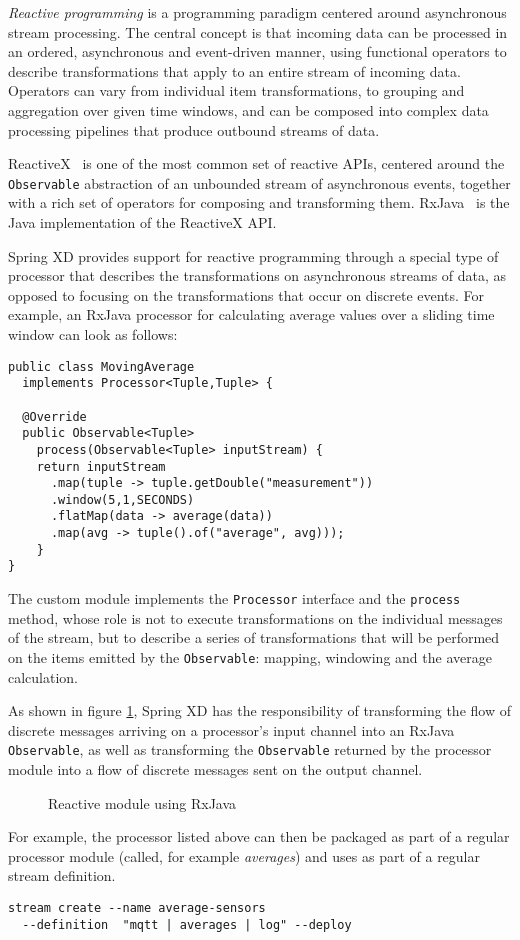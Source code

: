 \emph{Reactive programming} is a programming paradigm centered around asynchronous
stream processing. The central concept is that incoming data can be processed in an
ordered, asynchronous and event-driven manner, using functional operators to describe
transformations that apply to an entire stream of incoming data. Operators can
vary from individual item transformations, to grouping and aggregation over given
time windows, and can be composed into complex data processing pipelines that produce
outbound streams of data.

ReactiveX~\cite{reactivex} is one of the most common set of reactive APIs, centered around
the \texttt{Observable} abstraction of an unbounded stream of asynchronous events,
together with a rich set of operators for composing and transforming them.
RxJava~\cite{rxjava} is the Java implementation of the ReactiveX API.

Spring XD provides support for reactive programming through a special type of
processor that describes the transformations on asynchronous streams of data, as
opposed to focusing on the transformations that occur on discrete events. For example,
an RxJava processor for calculating average values over a sliding time window can look as follows:

\begin{lstlisting}
public class MovingAverage
  implements Processor<Tuple,Tuple> {

  @Override
  public Observable<Tuple>
    process(Observable<Tuple> inputStream) {
    return inputStream
      .map(tuple -> tuple.getDouble("measurement"))
      .window(5,1,SECONDS)
      .flatMap(data -> average(data))
      .map(avg -> tuple().of("average", avg)));
    }
}
\end{lstlisting}

The custom module implements the \texttt{Processor} interface and the
\texttt{process} method, whose role is not to execute transformations
on the individual messages of the stream, but to describe a series of
transformations that will be performed on the items emitted by the
\texttt{Observable}: mapping, windowing and the average calculation.

As shown in figure \ref{fig:rxjava}, Spring XD has the responsibility of transforming the
flow of discrete messages arriving on a processor's input channel into an
RxJava \texttt{Observable}, as well as transforming the \texttt{Observable}
returned by the processor module into a flow of discrete messages sent on
the output channel.

\begin{figure}[ht]
\centering
{}
\caption{Reactive module using RxJava}
\label{fig:rxjava}
\end{figure}

For example, the processor listed above can then be packaged as part of a regular
 processor module (called, for example \emph{averages}) and uses as part of a
 regular stream definition.

\begin{lstlisting}
stream create --name average-sensors
  --definition  "mqtt | averages | log" --deploy
\end{lstlisting}
